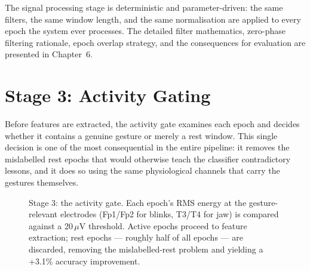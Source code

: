 The signal processing stage is deterministic and parameter-driven:
the same filters, the same window length, and the same normalisation
are applied to every epoch the system ever processes. The detailed
filter mathematics, zero-phase filtering rationale, epoch overlap
strategy, and the consequences for evaluation are presented in
Chapter~6.

\section{Stage 3: Activity Gating}
\label{sec:mo_gating}

Before features are extracted, the activity gate examines each
epoch and decides whether it contains a genuine gesture or merely a
rest window. This single decision is one of the most consequential
in the entire pipeline: it removes the mislabelled rest epochs that
would otherwise teach the classifier contradictory lessons, and it
does so using the same physiological channels that carry the
gestures themselves.

\begin{figure}[htbp]
\centering
{}
\caption{Stage 3: the activity gate. Each epoch's RMS energy at the
gesture-relevant electrodes (Fp1/Fp2 for blinks, T3/T4 for jaw) is
compared against a 20\,$\mu$V threshold. Active epochs proceed to
feature extraction; rest epochs --- roughly half of all epochs ---
are discarded, removing the mislabelled-rest problem and yielding a
+3.1\% accuracy improvement.}
\label{fig:mo_gating}
\end{figure}

